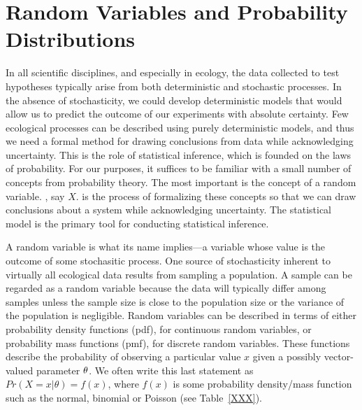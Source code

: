 \section{Random Variables and Probability Distributions}

In all scientific disciplines, and especially in ecology, the data
collected to test hypotheses typically arise from both deterministic and stochastic
processes. In the absence of stochasticity, we could develop
deterministic models that would
allow us to predict the outcome of our experiments with absolute
certainty. Few ecological processes can be described using purely
deterministic models, and
thus we need a formal method for drawing conclusions from data while
acknowledging uncertainty. This is the role of statistical inference,
which is founded on the laws of probability. For our purposes, it
suffices to be familiar with a small number of concepts from
probability theory. The most important is the concept of a random
variable. , say $X$.  is the process of
formalizing these concepts so that we can draw conclusions about a
system while acknowledging uncertainty. The statistical model is the
primary tool for conducting statistical inference.

A random variable is what its name implies---a variable whose
value is the outcome of some stochasitic process. One source
of stochasticity inherent to virtually all ecological data
results from sampling a population. A sample can be
regarded as a random variable because the data will typically differ
among samples unless the sample size is close to the population size or the
variance of the population is negligible.
Random variables can be described in terms of either probability
density functions (pdf), for continuous random variables, or probability
mass functions (pmf), for discrete random variables. These functions
describe the probability of observing a particular value $x$ given a
possibly vector-valued parameter $\bold \theta$. We often write this
last statement as $Pr(X=x | \theta) = f(x)$, where $f(x)$ is some
probability density/mass function such as the normal, binomial or
Poisson (see Table~\ref{XXX}).

